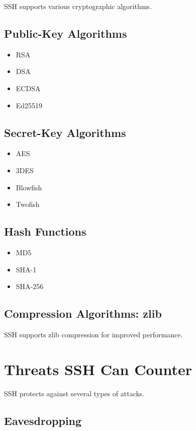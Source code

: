\documentclass[12pt]{book}
\begin{document}
SSH supports various cryptographic algorithms.

\subsection{Public-Key Algorithms}
\begin{itemize}
    \item RSA
    \item DSA
    \item ECDSA
    \item Ed25519
\end{itemize}

\subsection{Secret-Key Algorithms}
\begin{itemize}
    \item AES
    \item 3DES
    \item Blowfish
    \item Twofish
\end{itemize}

\subsection{Hash Functions}
\begin{itemize}
    \item MD5
    \item SHA-1
    \item SHA-256
\end{itemize}

\subsection{Compression Algorithms: zlib}

SSH supports zlib compression for improved performance.

\section{Threats SSH Can Counter}

SSH protects against several types of attacks.

\subsection{Eavesdropping}
\end{document}
